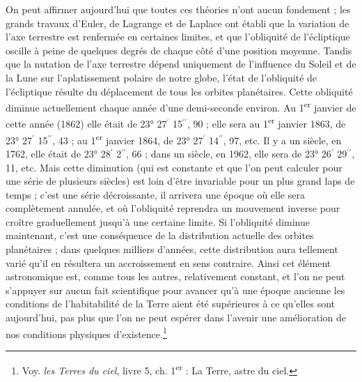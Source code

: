 \documentclass[a4paper, 11pt, oneside, landscape]{article}
\begin{document}
On peut affirmer aujourd'hui que toutes ces théories n'ont aucun fondement ; les grands travaux d'Euler, de Lagrange et de Laplace ont établi que la variation de l'axe terrestre est renfermée en certaines limites, et que l'obliquité de l'écliptique oscille à peine de quelques degrés de chaque côté d'une position moyenne. Tandis que la nutation de l'axe terrestre dépend uniquement de l'influence du Soleil et de la Lune sur l'aplatissement polaire de notre globe, l'état de l'obliquité de l'écliptique résulte du déplacement de tous les orbites planétaires. Cette obliquité diminue actuellement chaque année d'une demi-seconde environ. Au 1\textsuperscript{er} janvier de cette année (1862) elle était de 23° 27$^{\prime}$ 15$^{\prime\prime}$, 90 ; elle sera au 1\textsuperscript{er} janvier 1863, de 23° 27$^{\prime}$ 15$^{\prime\prime}$, 43 ; au 1\textsuperscript{er} janvier 1864, de 23° 27$^{\prime}$ 14$^{\prime\prime}$, 97, etc. Il y a un siècle, en 1762, elle était de 23° 28$^{\prime}$ 2$^{\prime\prime}$, 66 ; dans un siècle, en 1962, elle sera de 23° 26$^{\prime}$ 29$^{\prime\prime}$, 11, etc. Mais cette diminution (qui est constante et que l'on peut calculer pour une série de plusieurs siècles) est loin d'être invariable pour un plus grand laps de temps ; c'est une série décroissante, il arrivera une époque où elle sera complètement annulée, et où l'obliquité reprendra un mouvement inverse pour croître graduellement jusqu'à une certaine limite. Si l'obliquité diminue maintenant, c'est une conséquence de la distribution actuelle des orbites planétaires ; dans quelques milliers d'années, cette distribution aura tellement varié qu'il en résultera un accroissement en sens contraire. Ainsi cet élément astronomique est, comme tous les autres, relativement constant, et l'on ne peut s'appuyer sur aucun fait scientifique pour avancer qu'à une époque ancienne les conditions de l'habitabilité de la Terre aient été supérieures à ce qu'elles sont aujourd'hui, pas plus que l'on ne peut espérer dans l'avenir une amélioration de nos conditions physiques d'existence.\footnote{Voy. \emph{les Terres du ciel}, livre 5, ch. 1\textsuperscript{er} : La Terre, astre du ciel.}
\end{document}
